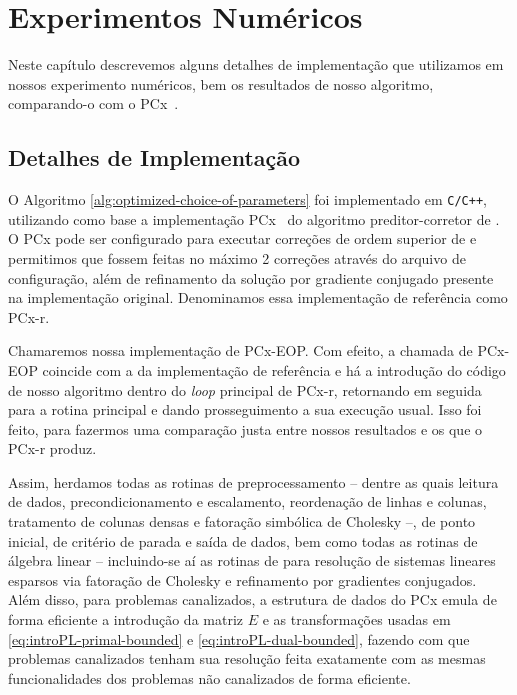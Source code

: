 \chapter{Experimentos Numéricos}
\label{chap:numerical}

Neste capítulo descrevemos alguns detalhes de implementação que utilizamos em nossos experimento numéricos, bem os resultados de nosso algoritmo, comparando-o com o  PCx~\cite{Czyzyk:1999hk}.



\section{Detalhes de Implementação}

O Algoritmo \ref{alg:optimized-choice-of-parameters} foi implementado em  \texttt{C/C++}, utilizando como base a implementação PCx~\cite{Czyzyk:1999hk} do algoritmo preditor-corretor de \textcite{Mehrotra:1992wr}. O PCx pode ser configurado para executar correções de ordem superior de \textcite{Gondzio:1996uw} e permitimos que fossem feitas no máximo 2 correções através do arquivo de configuração, além de  refinamento da solução por gradiente conjugado presente na implementação original. Denominamos essa implementação de referência como PCx-r.

  Chamaremos nossa implementação de PCx-EOP. Com efeito, a chamada de PCx-EOP coincide com a da implementação de referência e há a introdução do código de nosso algoritmo dentro do \emph{loop} principal de PCx-r,  retornando em seguida para a rotina principal e dando prosseguimento a sua execução usual. Isso foi feito, para fazermos uma comparação justa entre nossos resultados e os que o PCx-r produz. 

  Assim, herdamos todas as rotinas de preprocessamento -- dentre as quais leitura de dados, precondicionamento e escalamento, reordenação de linhas e colunas, tratamento de colunas densas e fatoração simbólica de Cholesky --, de ponto inicial, de critério de parada e saída de dados,   bem como todas as rotinas de álgebra linear -- incluindo-se aí as rotinas de \textcite{Ng:1993uz} para resolução de sistemas lineares esparsos via fatoração de Cholesky  e refinamento por gradientes conjugados. Além disso, para problemas canalizados, a estrutura de dados do PCx emula de forma eficiente a introdução da matriz $E$ e as transformações usadas em \eqref{eq:introPL-primal-bounded} e \eqref{eq:introPL-dual-bounded}, fazendo com que problemas canalizados tenham sua resolução feita exatamente com  as mesmas funcionalidades dos problemas não canalizados de forma eficiente. 



